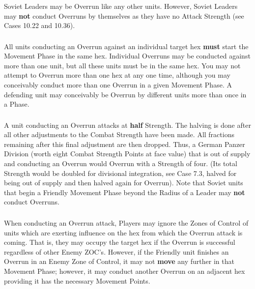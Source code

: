 \subsubsection{} Soviet Leaders may be Overrun like any other units. However, Soviet Leaders may \textbf{not} conduct Overruns by themselves as they have no Attack Strength (see Cases 10.22 and 10.36).

\subsubsection{} All units conducting an Overrun against an individual target hex \textbf{must} start the Movement Phase in the same hex. Individual Overruns may be conducted against more than one unit, but all these units must be in the same hex. You may not attempt to Overrun more than one hex at any one time, although you may conceivably conduct more than one Overrun in a given Movement Phase. A defending unit may conceivably be Overrun by different units more than once in a Phase.

\subsubsection{} A unit conducting an Overrun attacks at \textbf{half} Strength. The halving is done after all other adjustments to the Combat Strength have been made. All fractions remaining after this final adjustment are then dropped. Thus, a German Panzer Division (worth eight Combat Strength Points at face value) that is out of supply and conducting an Overrun would Overrun with a Strength of four. (Its total Strength would be doubled for divisional integration, see Case 7.3, halved for being out of supply and then halved again for Overrun). Note that Soviet units that begin a Friendly Movement Phase beyond the Radius of a Leader may \textbf{not} conduct Overruns.

\subsubsection{} When conducting an Overrun attack, Players may ignore the Zones of Control of units which are exerting influence on the hex from which the Overrun attack is coming. That is, they may occupy the target hex if the Overrun is successful regardless of other Enemy ZOC's. However, if the Friendly unit finishes an Overrun in an Enemy Zone of Control, it may not \textbf{move} any further in that Movement Phase; however, it may conduct another Overrun on an adjacent hex providing it has the necessary Movement Points.

